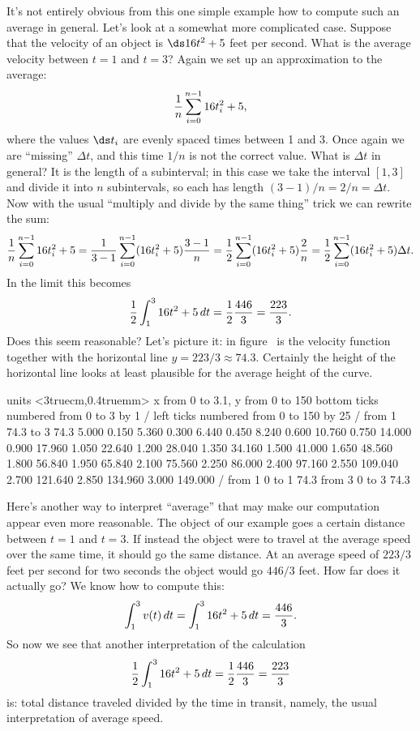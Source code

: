 It's not entirely obvious from this one simple example how to compute
such an average in general. Let's look at a somewhat more complicated
case. Suppose that the velocity of an object is $\ds 16
t^2+5$ feet per second. 
What is the average velocity between $t=1$ and $t=3$? Again we
set up an approximation to the average:
$${1\over n}\sum_{i=0}^{n-1} 16t_i^2+5,$$
where the values $\ds t_i$ are evenly spaced 
times between 1 and 3. Once again we are ``missing'' $\Delta t$, and
this time $1/n$ is not the correct value. What is $\Delta t$ in
general? It is the length of a subinterval; in this case we take the
interval $[1,3]$ and divide it into $n$ subintervals, so each
has length $(3-1)/n=2/n=\Delta t$. Now with the usual ``multiply and
divide by the same thing'' trick we can rewrite the sum:
$$
  {1\over n}\sum_{i=0}^{n-1} 16t_i^2+5=
  {1\over 3-1}\sum_{i=0}^{n-1} (16t_i^2+5){3-1\over n}=
  {1\over 2}\sum_{i=0}^{n-1} (16t_i^2+5){2\over n}=
  {1\over 2}\sum_{i=0}^{n-1} (16t_i^2+5)\Delta t.
$$
In the limit this becomes
$${1\over 2}\int_1^3 16t^2+5\,dt={1\over 2}{446\over 3}={223\over 3}.$$
Does this seem reasonable? Let's picture it: in
figure~ is the velocity function together
with the horizontal line $y=223/3\approx 74.3$. Certainly 
the height of the
horizontal line looks at least plausible for the average height of the
curve.

\figure
\vbox{\beginpicture
\normalgraphs
\ninepoint
\setcoordinatesystem units <3truecm,0.4truemm>
\setplotarea x from 0 to 3.1, y from 0 to 150
\axis bottom ticks numbered from 0 to 3 by 1 /
\axis left ticks numbered from 0 to 150 by 25 /
\putrule from 1 74.3 to 3 74.3
\setquadratic
{} 5.000 0.150 5.360 0.300 6.440 0.450 8.240 0.600 10.760 
0.750 14.000 0.900 17.960 1.050 22.640 1.200 28.040 1.350 34.160 
1.500 41.000 1.650 48.560 1.800 56.840 1.950 65.840 2.100 75.560 
2.250 86.000 2.400 97.160 2.550 109.040 2.700 121.640 2.850 134.960 
3.000 149.000 /
\setdashes
\putrule from 1 0 to 1 74.3
\putrule from 3 0 to 3 74.3
\endpicture}

Here's another way to interpret ``average'' that may make our
computation appear even more reasonable. The object of our example
goes a certain distance between $t=1$ and $t=3$. If instead the object
were to travel at the average speed over the same time, it should go
the same distance. At an average speed of $223/3$ feet per second for
two seconds the object would go $446/3$ feet. How far does it actually
go? We know how to compute this:
$$\int_1^3 v(t)\,dt = \int_1^3 16t^2+5\,dt={446\over 3}.$$
So now we see that another interpretation of the calculation
$${1\over 2}\int_1^3 16t^2+5\,dt={1\over 2}{446\over 3}={223\over 3}$$
is: total distance traveled divided by the time in transit, namely,
the usual interpretation of average speed.

